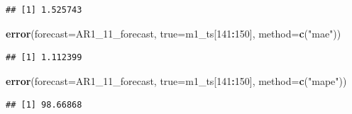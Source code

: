 \documentclass[
  11pt,
]{article}
\newenvironment{Shaded}{\begin{snugshade}}{\end{snugshade}}
\newcommand{\DataTypeTok}[1]{\textcolor[rgb]{0.13,0.29,0.53}{#1}}
\newcommand{\DecValTok}[1]{\textcolor[rgb]{0.00,0.00,0.81}{#1}}
\newcommand{\KeywordTok}[1]{\textcolor[rgb]{0.13,0.29,0.53}{\textbf{#1}}}
\newcommand{\NormalTok}[1]{#1}
\newcommand{\OperatorTok}[1]{\textcolor[rgb]{0.81,0.36,0.00}{\textbf{#1}}}
\newcommand{\StringTok}[1]{\textcolor[rgb]{0.31,0.60,0.02}{#1}}
\begin{document}
\begin{verbatim}
## [1] 1.525743
\end{verbatim}

\begin{Shaded}
\begin{Highlighting}[]
\KeywordTok{error}\NormalTok{(}\DataTypeTok{forecast=}\NormalTok{AR1_}\DecValTok{11}\NormalTok{_forecast, }\DataTypeTok{true=}\NormalTok{m1_ts[}\DecValTok{141}\OperatorTok{:}\DecValTok{150}\NormalTok{], }\DataTypeTok{method=}\KeywordTok{c}\NormalTok{(}\StringTok{"mae"}\NormalTok{))}
\end{Highlighting}
\end{Shaded}

\begin{verbatim}
## [1] 1.112399
\end{verbatim}

\begin{Shaded}
\begin{Highlighting}[]
\KeywordTok{error}\NormalTok{(}\DataTypeTok{forecast=}\NormalTok{AR1_}\DecValTok{11}\NormalTok{_forecast, }\DataTypeTok{true=}\NormalTok{m1_ts[}\DecValTok{141}\OperatorTok{:}\DecValTok{150}\NormalTok{], }\DataTypeTok{method=}\KeywordTok{c}\NormalTok{(}\StringTok{"mape"}\NormalTok{))}
\end{Highlighting}
\end{Shaded}

\begin{verbatim}
## [1] 98.66868
\end{verbatim}
\end{document}

